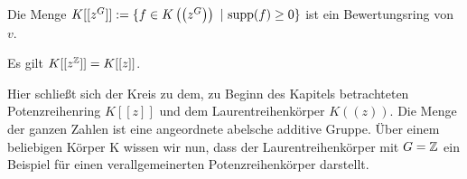 %
%
%
%
%
%
%
\begin{satz}
Die Menge $K\lbrack\lbrack z^G\rbrack\rbrack := \lbrace f \in K\left(\left(z^G\right)\right)~ \vert~ \textup{supp}(f) \geq 0\rbrace$ ist ein Bewertungsring von $v$.
\end{satz}
%
%
%
%
%
%
%
%
\begin{bsp}
Es gilt $K\lbrack\lbrack z^{\mathbb{Z}}\rbrack\rbrack = K\lbrack\lbrack z\rbrack\rbrack$.
\end{bsp}
%
%
Hier schließt sich der Kreis zu dem, zu Beginn des Kapitels betrachteten Potenzreihenring $K[[z]]$ und dem Laurentreihenkörper $K((z))$. Die Menge der ganzen Zahlen ist eine angeordnete abelsche additive Gruppe. Über einem beliebigen Körper K wissen wir nun, dass der Laurentreihenkörper mit $G = \mathbb{Z}$ ein Beispiel für einen verallgemeinerten Potenzreihenkörper darstellt.\\

